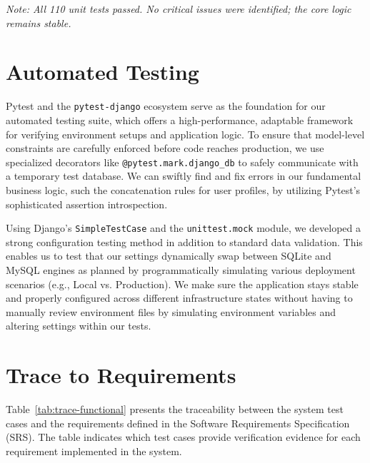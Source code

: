 \documentclass[12pt, titlepage]{article}
\begin{document}
\textit{Note: All 110 unit tests passed. No critical issues were identified; the core logic remains stable.}

\section{Automated Testing}

Pytest and the \texttt{pytest-django} ecosystem serve as the foundation for our automated testing suite, which offers a high-performance, adaptable framework for verifying environment setups and application logic. To ensure that model-level constraints are carefully enforced before code reaches production, we use specialized decorators like \texttt{@pytest.mark.django\_db} to safely communicate with a temporary test database. We can swiftly find and fix errors in our fundamental business logic, such the concatenation rules for user profiles, by utilizing Pytest's sophisticated assertion introspection.

Using Django's \texttt{SimpleTestCase} and the \texttt{unittest.mock} module, we developed a strong configuration testing method in addition to standard data validation. This enables us to test that our settings dynamically swap between SQLite and MySQL engines as planned by programmatically simulating various deployment scenarios (e.g., Local vs. Production). We make sure the application stays stable and properly configured across different infrastructure states without having to manually review environment files by simulating environment variables and altering settings within our tests.
\section{Trace to Requirements}
Table~\ref{tab:trace-functional} presents the traceability between the
system test cases and the requirements defined in the Software Requirements
Specification (SRS). The table indicates which test cases provide verification
evidence for each requirement implemented in the system.
\end{document}
